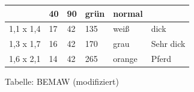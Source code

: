 \documentclass{article}
\newcommand\gZ[1]{\textcolor[rgb]{0.5019608,0.5019608,0.5019608}{#1}}
\begin{document}
\begin{flushleft}
\begin{tabular}{|m{1.5619999cm}|m{1.7229999cm}|m{1.7229999cm}|m{2.0509999cm}|m{1.7839999cm}|m{2.102cm}|}
 &
\centering \gZ{40}\par

 &
\centering \gZ{90}\par

 &
\centering gr\"un\par

 &
\centering normal\par

\\\hline
\centering \gZ{1,1 x 1,4}\par

 &
\centering \gZ{17}\par

 &
\centering \gZ{42}\par

 &
\centering \gZ{135}\par

 &
\centering wei{\ss}\par

 &
\centering dick\par

\\\hline
\centering \gZ{1,3 x 1,7}\par

 &
\centering \gZ{16}\par

 &
\centering \gZ{42}\par

 &
\centering \gZ{170}\par

 &
\centering grau\par

 &
\centering Sehr dick\par

\\\hline
\centering \gZ{1,6 x 2,1}\par

 &
\centering \gZ{14}\par

 &
\centering \gZ{42}\par

 &
\centering \gZ{265}\par

 &
\centering orange\par

 &
\centering Pferd\par

\\\hline
\end{tabular}
\end{flushleft}
{\mdseries\upshape
Tabelle: BEMAW (modifiziert)}
\end{document}
